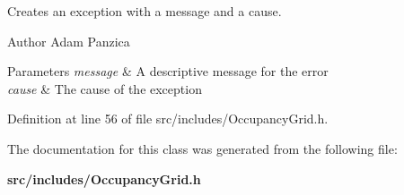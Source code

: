 \-Creates an exception with a message and a cause. 

\begin{DoxyAuthor}{\-Author}
\-Adam \-Panzica 
\end{DoxyAuthor}

\begin{DoxyParams}{\-Parameters}
{\em message} & \-A descriptive message for the error \\
\hline
{\em cause} & \-The cause of the exception \\
\hline
\end{DoxyParams}


\-Definition at line 56 of file src/includes/\-Occupancy\-Grid.\-h.



\-The documentation for this class was generated from the following file\-:\begin{DoxyCompactItemize}
\item 
{\bf src/includes/\-Occupancy\-Grid.\-h}\end{DoxyCompactItemize}
